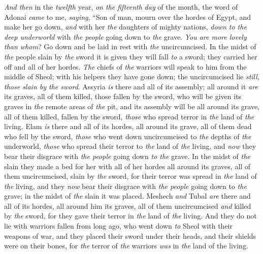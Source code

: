 \begin{biblechapter}
\verse \textit{And then} in the \textit{twelfth} year, \textit{on the fifteenth} \textit{day} of the month, the word of Adonai \textit{came} to me, \textit{saying},
\verse “Son of man, mourn over the hordes of Egypt, and make her go down, \textit{and} with her \textit{the} daughters of mighty nations, \textit{down to the deep underworld} with \textit{the people} going down to \textit{the} grave.
\verse \textit{You are more lovely than whom}? Go down and be laid in rest with \textit{the} uncircumcised.
\verse In the midst of \textit{the} people slain by \textit{the} sword it is given they will fall \textit{to} a sword; they carried her off and all of her hordes.
\verse \textit{The} chiefs of \textit{the} warriors will speak to him from the middle of Sheol; with his helpers they have gone down; the uncircumcised lie \textit{still}, \textit{those slain by the sword}.
\verse Assyria \textit{is} there and all of its assembly; all around it \textit{are} its graves, all of them killed, those fallen by the sword,
\verse who will be given its graves in \textit{the} remote areas of \textit{the} pit, and its assembly will be all around its grave, all of them killed, fallen by the sword, \textit{those} who spread terror in \textit{the} land of \textit{the} living.
\verse Elam \textit{is} there and all of its hordes, all around its grave, all of them dead who fell by the sword, \textit{those} who went down uncircumcised to \textit{the} depths of \textit{the} underworld, \textit{those} who spread their terror to \textit{the} land of \textit{the} living, and \textit{now} they bear their disgrace with \textit{the people} going down \textit{to the} grave.
\verse In the midst of \textit{the} slain they made a bed for her with all of her hordes all around its graves, all of them uncircumcised, slain by \textit{the} sword, for their terror was spread in \textit{the} land of \textit{the} living, and they \textit{now} bear their disgrace with \textit{the people} going down to \textit{the} grave; in the midst of \textit{the} slain it was placed.
\verse Meshech \textit{and} Tubal \textit{are} there and all of its hordes, all around him its graves, all of them uncircumcised \textit{and} killed by \textit{the} sword, for they gave their terror in \textit{the} land of \textit{the} living.
\verse And they do not lie with warriors fallen from long ago, who went down \textit{to} Sheol with their weapons of war, and they placed their sword under their heads, and their shields were on their bones, for \textit{the} terror of \textit{the} warriors \textit{was} in \textit{the} land of the living.

\end{biblechapter}
